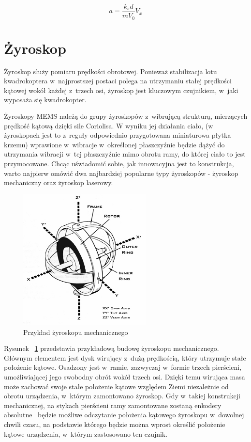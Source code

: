 \begin{equation}
	a = \frac{k{_s}d}{mV_0}V_x
\end{equation}

\section{Żyroskop}

Żyroskop służy pomiaru prędkości obrotowej. Ponieważ stabilizacja lotu kwadrokoptera w~najprostszej postaci polega na utrzymaniu stałej prędkości kątowej wokół każdej z~trzech osi, żyroskop jest kluczowym czujnikiem, w~jaki wyposaża się kwadrokopter\cite{quadro9, quadro16}. 

Żyroskopy MEMS należą do grupy żyroskopów z~wibrującą strukturą, mierzących prędkość kątową dzięki sile Coriolisa. W wyniku jej działania ciało, (w żyroskopach jest to z~reguły odpowiednio przygotowana miniaturowa płytka krzemu) wprawione w~wibracje w~określonej płaszczyźnie będzie dążyć do utrzymania wibracji w~tej płaszczyźnie mimo obrotu ramy, do której ciało to jest przymocowane. Chcąc uświadomić sobie, jak innowacyjna jest to konstrukcja, warto najpierw omówić dwa najbardziej popularne typy żyroskopów - żyroskop mechaniczny oraz żyroskop laserowy.

\begin{figure}[H]
	\centering
	\includegraphics[width=0.6\textwidth]{Pictures/Gyroscope_Theory.jpg}
	\caption[Przykład żyroskopu mechanicznego]{Przykład żyroskopu mechanicznego~\cite{mems10}}
	\label{fig:Gyroscope_Theory}
\end{figure}

Rysunek ~\ref{fig:Gyroscope_Theory} przedstawia przykładową budowę żyroskopu mechanicznego. Głównym elementem jest dysk wirujący z~dużą prędkością, który utrzymuje stałe położenie kątowe. Osadzony jest w~ramie, zazwyczaj w~formie trzech pierścieni, umożliwiającej jego swobodny obrót wokół trzech osi. Dzięki temu wirująca masa może zachować swoje stałe położenie kątowe względem Ziemi niezależnie od obrotu urządzenia, w~którym zamontowano żyroskop. Gdy w~takiej konstrukcji mechanicznej, na stykach pierścieni ramy zamontowane zostaną enkodery absolutne~\cite{mems11} będzie możliwe odczytanie położenia kątowego żyroskopu w~dowolnej chwili czasu, na podstawie którego będzie można wprost określić położenie kątowe urządzenia, w~którym zastosowano ten czujnik. 


